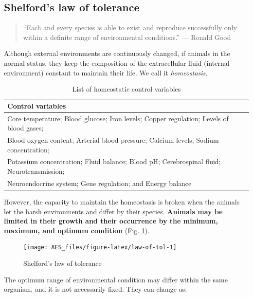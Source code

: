 \documentclass[]{book}
\begin{document}
\subsection{Shelford's law of
tolerance}\label{shelfords-law-of-tolerance}

\begin{quote}
``Each and every species is able to exist and reproduce successfully
only within a definite range of environmental conditions.'' --- Ronald
Good
\end{quote}

Although external environments are continuously changed, if animals in
the normal status, they keep the composition of the extracellular fluid
(internal environment) constant to maintain their life. We call it
\emph{homeostasis}.

\begin{table}[t]

\caption{\label{tab:homeostasis}List of homeostatic control variables}
\centering
\begin{tabular}{l}
\toprule
Control variables\\
\midrule
Core temperature; Blood glucose; Iron levels; Copper regulation; Levels of blood gases;\\
Blood oxygen content; Arterial blood pressure; Calcium levels; Sodium concentration;\\
Potassium concentration; Fluid balance; Blood pH; Cerebrospinal fluid; Neurotransmission;\\
Neuroendocrine system; Gene regulation; and Energy balance\\
\bottomrule
\end{tabular}
\end{table}

However, the capacity to maintain the homeostasis is broken when the
animals let the harsh environments and differ by their species.
\textbf{Animals may be limited in their growth and their occurrence by
the minimum, maximum, and optimum condition} \citep{shelford} (Fig.
\ref{fig:law-of-tol}).

\begin{figure}

{\centering \texttt{[image: AES\_files/figure-latex/law-of-tol-1]} 

}

\caption{Shelford's law of tolerance}\label{fig:law-of-tol}
\end{figure}

The optimum range of environmental condition may differ within the same
organism, and it is not necessarily fixed. They can change as:
\end{document}
